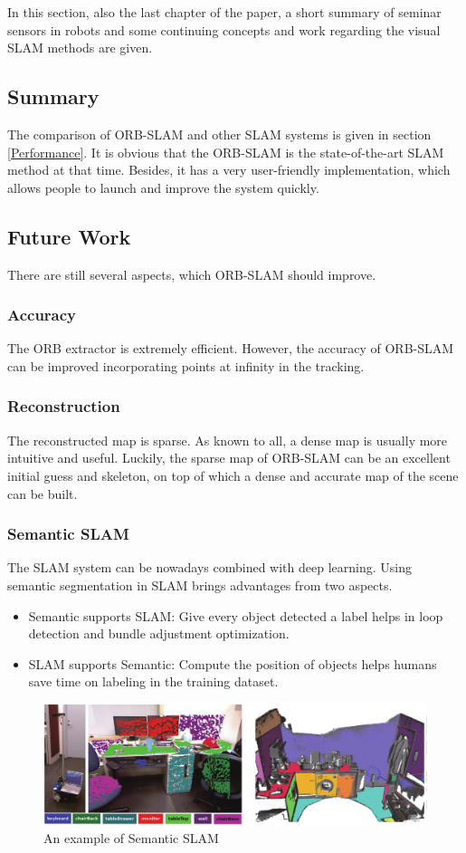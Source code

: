 \documentclass[letterpaper, 10 pt, conference]{ieeeconf}  %
\begin{document}
In this section, also the last chapter of the paper, a short summary of seminar sensors in robots and some continuing concepts and work regarding the visual SLAM methods are given.

\subsection{Summary}
The comparison of ORB-SLAM and other SLAM systems is given in section \ref{Performance}. It is obvious that the ORB-SLAM is the state-of-the-art SLAM method at that time. Besides, it has a very user-friendly implementation, which allows people to launch and improve the system quickly. 

\subsection{Future Work}
There are still several aspects, which ORB-SLAM should improve.
\subsubsection{Accuracy}
The ORB extractor is extremely efficient. However, the accuracy of ORB-SLAM can be improved incorporating points at infinity in the tracking.
\subsubsection{Reconstruction}
The reconstructed map is sparse. As known to all, a dense map is usually more intuitive and useful. Luckily, the sparse map of ORB-SLAM can be an excellent initial guess and skeleton, on top of which a dense and accurate map of the scene can be built.
\subsubsection{Semantic SLAM}
The SLAM system can be nowadays combined with deep learning. Using semantic segmentation in SLAM brings advantages from two aspects.
%
\begin{itemize}
\item Semantic supports SLAM: Give every object detected a label helps in loop detection and bundle adjustment optimization.
\item SLAM supports Semantic: Compute the position of objects helps humans save time on labeling in the training dataset.
\end{itemize}
%
\begin{figure}[!htbp]
\centering
\includegraphics[scale=0.14]{./images/semantic_slam}
\caption{An example of Semantic SLAM}
\label{semantic_slam}
\end{figure}
\end{document}
